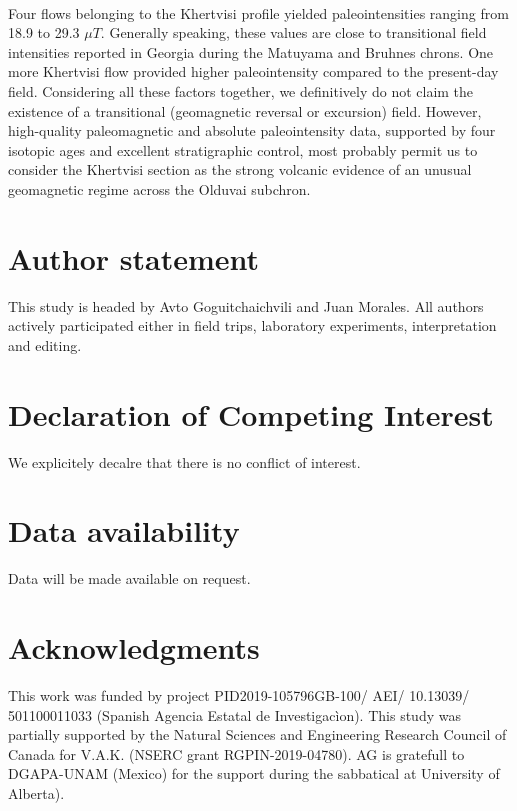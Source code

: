 \documentclass[review]{elsarticle}
\begin{document}
\\
Four flows belonging to the Khertvisi profile yielded paleointensities ranging from 18.9 to 29.3 $\mu T$. Generally speaking, these values are close to transitional field intensities reported in Georgia during the Matuyama and Bruhnes chrons. One more Khertvisi flow provided higher paleointensity compared to the present-day field. Considering all these factors together, we definitively do not claim the existence of a transitional (geomagnetic reversal or excursion) field. However, high-quality paleomagnetic and absolute paleointensity data, supported by four isotopic ages and excellent stratigraphic control, most probably permit us to consider the Khertvisi section as the strong volcanic evidence of an unusual geomagnetic regime across the Olduvai subchron.

\section*{Author statement}
This study is headed by Avto Goguitchaichvili and Juan Morales. All authors actively participated either in field trips, laboratory experiments, interpretation and editing.

\section*{Declaration of Competing Interest}
We explicitely decalre that there is no conflict of interest.
\section*{Data availability}
Data will be made available on request.
\section*{Acknowledgments}
This work was funded by project PID2019-105796GB-100/ AEI/ 10.13039/ 501100011033 (Spanish Agencia Estatal de Investigac{\`i}on). This study was partially supported by the Natural Sciences and Engineering Research Council of Canada for V.A.K. (NSERC grant RGPIN-2019-04780). AG is gratefull to DGAPA-UNAM (Mexico) for the support during the sabbatical at University of Alberta).
\end{document}
